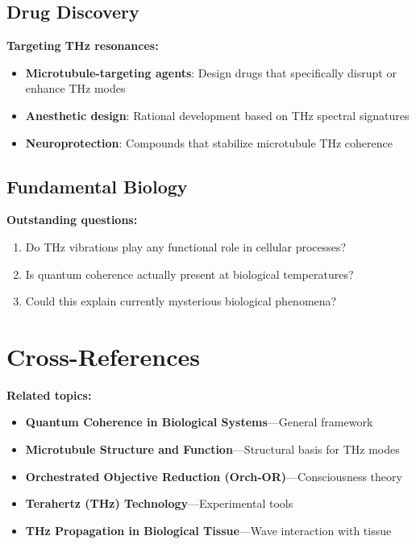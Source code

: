 \subsection{Drug Discovery}

\textbf{Targeting THz resonances:}
\begin{itemize}
\item \textbf{Microtubule-targeting agents}: Design drugs that specifically disrupt or enhance THz modes
\item \textbf{Anesthetic design}: Rational development based on THz spectral signatures
\item \textbf{Neuroprotection}: Compounds that stabilize microtubule THz coherence
\end{itemize}

\subsection{Fundamental Biology}

\textbf{Outstanding questions:}
\begin{enumerate}
\item Do THz vibrations play any functional role in cellular processes?
\item Is quantum coherence actually present at biological temperatures?
\item Could this explain currently mysterious biological phenomena?
\end{enumerate}

\section{Cross-References}

\textbf{Related topics:}
\begin{itemize}
\item \textbf{Quantum Coherence in Biological Systems}---General framework
\item \textbf{Microtubule Structure and Function}---Structural basis for THz modes
\item \textbf{Orchestrated Objective Reduction (Orch-OR)}---Consciousness theory
\item \textbf{Terahertz (THz) Technology}---Experimental tools
\item \textbf{THz Propagation in Biological Tissue}---Wave interaction with tissue
\end{itemize}

